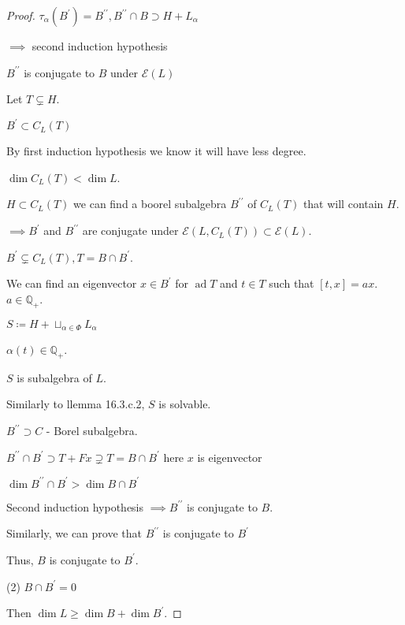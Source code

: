 \documentclass{article}
\theoremstyle{definition}
\begin{document}
\begin{proof}
        \(\tau_\alpha (B^{\prime}) = B^{\prime\prime}, B^{\prime\prime} \cap B \supset H + L_\alpha \) 

        \(\implies\) second induction hypothesis

        \(B^{\prime\prime} \) is conjugate to \(B\) under \(\mathscr{E} (L)\)

        Let \(T \subsetneq H\).

        \(B^{\prime} \subset C_L(T)\)

        By first induction hypothesis we know it will have less degree.
        
        \(\dim C_L(T) < \dim L\).
        
        \(H \subset C_L(T)\) we can find a boorel subalgebra \(B^{\prime\prime}\) of \(C_L (T)\) that will contain \(H\).

        \(\implies B^{\prime}\) and \(B^{\prime\prime}\) are conjugate under \(\mathscr{E} (L, C_L(T)) \subset \mathscr{E} (L)\).

        \(B^{\prime} \subsetneq C_L(T), T = B\cap B^{\prime}\).

        We can find an eigenvector \(x\in B^{\prime}\) for \(\operatorname{ad} T\) and \(t\in T\) such that \([t,x] = ax\). \(a\in\mathbb{Q}_+\).

        \(S \coloneqq H + \sqcup_{\alpha \in \Phi} L_\alpha\) 

        \(\alpha(t) \in \mathbb{Q}_+\).

        \(S\) is subalgebra of \(L\).
        
        Similarly to llemma 16.3.c.2, \(S\) is solvable.

        \(B^{\prime\prime} \supset C\) -  Borel subalgebra.

        \(B^{\prime\prime} \cap B^{\prime}  \supset T + Fx \supsetneq T = B \cap B^{\prime}\) here \(x\) is eigenvector

        \(\dim B^{\prime\prime} \cap B^{\prime} > \dim B\cap B^{\prime}\)

        Second induction hypothesis \(\implies B^{\prime\prime}\) is conjugate to \(B\).

        Similarly, we can prove that \(B^{\prime\prime}\) is conjugate to \(B^{\prime}\)

        Thus, \(B\) is conjugate to \(B^{\prime}\).

        (2) \(B\cap B^{\prime} = 0\)

        Then \(\dim L \geq \dim B + \dim B^{\prime}\).


\end{proof}
\end{document}
